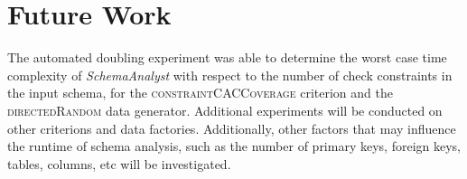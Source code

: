 \documentclass{sig-alternate}
\begin{document}
\section{Future Work}
The automated doubling experiment was able to determine the worst case
time complexity of \textit{SchemaAnalyst} with respect to the number of
check constraints in the input schema, for the
\textsc{constraintCACCoverage} criterion and the
\textsc{directedRandom} data generator.  Additional experiments will be
conducted on other criterions and data factories. Additionally, other factors 
that may influence the runtime of schema analysis,
such as the number of primary keys, foreign keys, tables, columns, etc
will be investigated.


%

%
%
\end{document}

